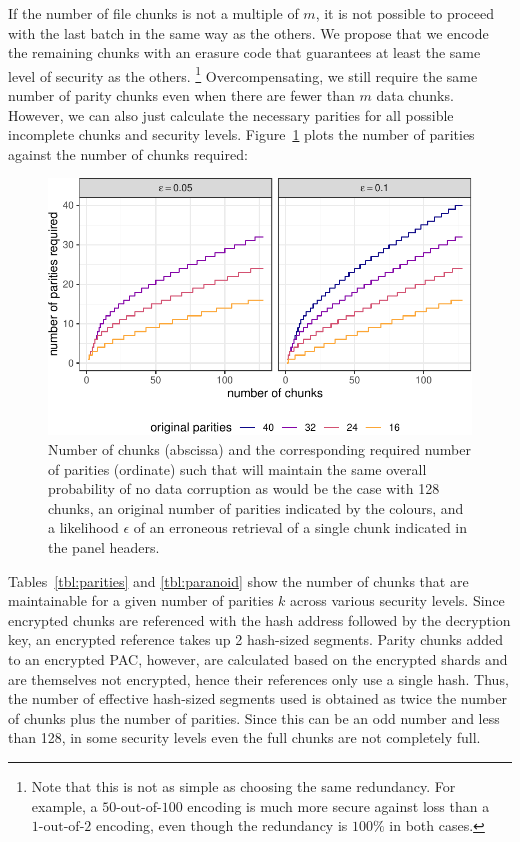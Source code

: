 \documentclass[manuscript,screen,review]{acmart}
\begin{document}
If the number of file chunks is not a multiple of $m$, it is not possible to proceed with the last batch in the same way as the others. We propose that we encode the remaining chunks with an erasure code that guarantees at least the same level of security as the others.%
%
\footnote{Note that this is not as simple as choosing the same redundancy. For example, a $50\text{-out-of-}100$ encoding is much more secure against loss than a $1\text{-out-of-}2$ encoding, even though the redundancy is $100\%$ in both cases.}
%
Overcompensating, we still require the same number of parity chunks even when there are fewer than $m$ data chunks. However, we can also just calculate the necessary parities for all possible incomplete chunks and security levels. Figure~\ref{fig:maintain} plots the number of parities against the number of chunks required:


\begin{figure}[!ht]
  \centering
  \includegraphics[width=.8\textwidth]{fig-maintain-1.pdf}
  \caption{Number of chunks (abscissa) and the corresponding required number of parities (ordinate) such that will maintain the same overall probability of no data corruption as would be the case with 128 chunks, an original number of parities indicated by the colours, and a likelihood $\epsilon$ of an erroneous retrieval of a single chunk indicated in the panel headers.}
  \label{fig:maintain}
\end{figure}

Tables~\ref{tbl:parities} and \ref{tbl:paranoid} show 
the number of chunks that are maintainable for a given number of parities $k$ across various security levels.
Since encrypted chunks are referenced with the hash address followed by the decryption key, an encrypted reference takes up 2 hash-sized segments. Parity chunks added to an encrypted PAC, however, are calculated based on the encrypted shards and are themselves not encrypted, hence their references only use a single hash. 
Thus, the number of effective hash-sized segments 
used is obtained as twice the number of chunks plus the number of parities. Since this can be an odd number and less than 128, in some security levels even the full chunks are not completely full.
\end{document}
